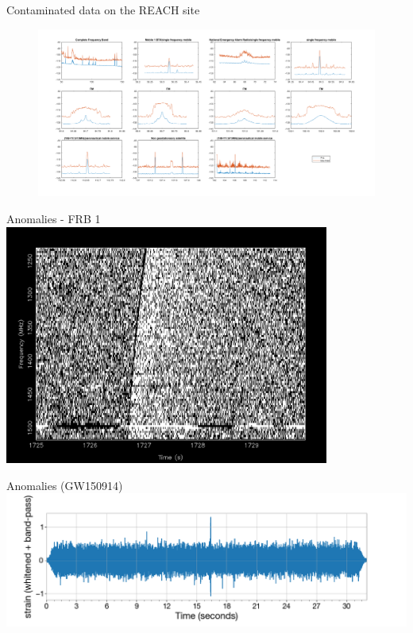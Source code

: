 \documentclass[aspectratio=169]{beamer}
\begin{document}
\begin{frame}{Contaminated data on the REACH site}
  \begin{figure}
    \centering
    \includegraphics[width=\textwidth]{images/rfi_site.png}
  \end{figure}
\end{frame}

\begin{frame}{Anomalies - FRB 1}
  \centering
  \includegraphics[width=0.8\textwidth]{images/Frb_1.png}
\end{frame}

\begin{frame}{Anomalies (GW150914)}
  \centering
  \includegraphics[width=\textwidth]{images/gwanomaly.png}
\end{frame}
\end{document}

